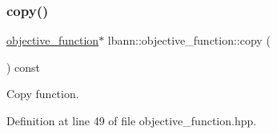 \mbox{\label{classlbann_1_1objective__function_a8ab03f0dc1d2c067b895f5859bacd810}} 
\subsubsection{\texorpdfstring{copy()}{copy()}}
{\footnotesize\ttfamily \hyperlink{classlbann_1_1objective__function}{objective\+\_\+function}$\ast$ lbann\+::objective\+\_\+function\+::copy (\begin{DoxyParamCaption}{ }\end{DoxyParamCaption}) const\hspace{0.3cm}{\ttfamily [inline]}}

Copy function. 

Definition at line 49 of file objective\+\_\+function.\+hpp.


